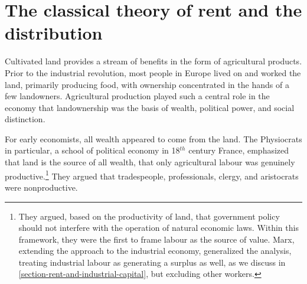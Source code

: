 
 
\section{The classical theory of rent and the distribution}


Cultivated land provides a stream of benefits in the form of agricultural products.
Prior to the industrial revolution, most people in Europe lived on and worked the land, primarily producing food, with ownership concentrated in the hands of a few landowners.  Agricultural production played such a central role in the economy that landownership was the basis of wealth, political power, and social distinction.   

For early economists, all wealth appeared to come from the land. The Physiocrats in particular, a school of \gls{political economy} in 18$^{th}$ century France, emphasized that land is the source of all wealth, that only agricultural labour was genuinely productive.\footnote{They argued, based on the productivity of land, that government policy should not interfere with the operation of natural economic laws. Within this framework, they were the first to frame labour as the source of value. Marx, extending the approach to the industrial economy, generalized the analysis, treating industrial labour as generating a surplus as well, as we discuss in \ref{section-rent-and-industrial-capital}, but excluding other workers.} They argued that tradespeople, professionals, clergy, and aristocrats were nonproductive.

